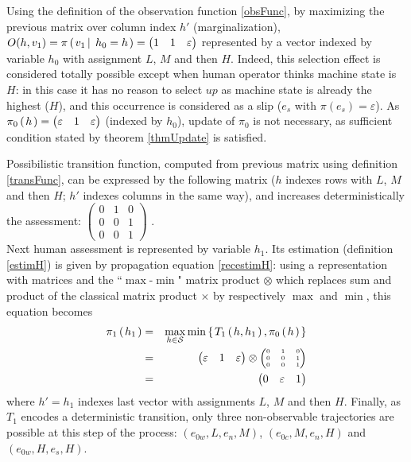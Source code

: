 Using the definition of the observation function \ref{obsFunc}, 
by maximizing the previous matrix over column index $h'$
(marginalization), 
$O(h,v_1) = \pi \left( \left.  v_1 \, \right| \left. \, h_0=h \right. \right) = \begin{pmatrix} 1 & 1 & \varepsilon \end{pmatrix}$
represented by a vector indexed by variable $h_0$ with assignment $L$, $M$ and then $H$.
Indeed, this selection effect is considered totally possible 
except when human operator thinks machine state is $H$: 
in this case it has no reason to select $up$ 
as machine state is already the highest ($H$), 
and this occurrence is considered as a slip 
($e_s$ with $\pi(e_s) = \varepsilon$).  
As $\pi_0 \left( \left.  h  \right. \right) = \begin{pmatrix} \varepsilon & 1 & \varepsilon \end{pmatrix}$ 
(indexed by $h_0$), 
update of $\pi_0$ is not necessary, 
as sufficient condition stated by theorem \ref{thmUpdate}
is satisfied. 

Possibilistic transition function, 
computed from previous matrix using definition \ref{transFunc}, 
can be expressed by the following matrix 
($h$ indexes rows with $L$, $M$ and then $H$; $h'$ indexes columns in the same way), 
and increases deterministically the assessment:
\tiny
$\begin{pmatrix}
0 & 1 & 0 \\
0 & 0 & 1 \\
0 & 0 & 1 
\end{pmatrix}
$
\normalsize
.\\

Next human assessment is represented by variable $h_1$.
Its estimation (definition \ref{estimH})
is given by propagation equation \ref{recestimH}: 
using a representation with matrices 
and the ``$\max$-$\min$" matrix product $\otimes$ 
which replaces sum and product 
of the classical matrix product $\times$ 
by respectively $\max$ and $\min$, 
this equation becomes
\begin{eqnarray*} 
\pi_1 \left( \left. h_1 \right. \right) & = & \max_{h \in \mathcal{S}} \min \left\{ \left.  T_1 \left( \left. h, h_1 \right. \right), \pi_0 \left( \left.  h  \right. \right)   \right. \right\}  \\
 & = & \begin{pmatrix} \varepsilon & 1 & \varepsilon \end{pmatrix} \otimes  \tiny
\begin{pmatrix}
0 & 1 & 0 \\
0 & 0 & 1 \\
0 & 0 & 1 
\end{pmatrix}
\normalsize \\
& = & \begin{pmatrix} 0 & \varepsilon & 1 \end{pmatrix} 
\end{eqnarray*}
where $h'=h_1$ indexes last vector with assignments $L$, $M$ and then $H$.
Finally, as $T_1$ encodes a deterministic transition, 
only three non-observable trajectories are possible
at this step of the process:
$(e_{0w},L,e_{n},M)$, $(e_{0c},M,e_n,H)$ and $(e_{0w},H,e_s,H)$.

